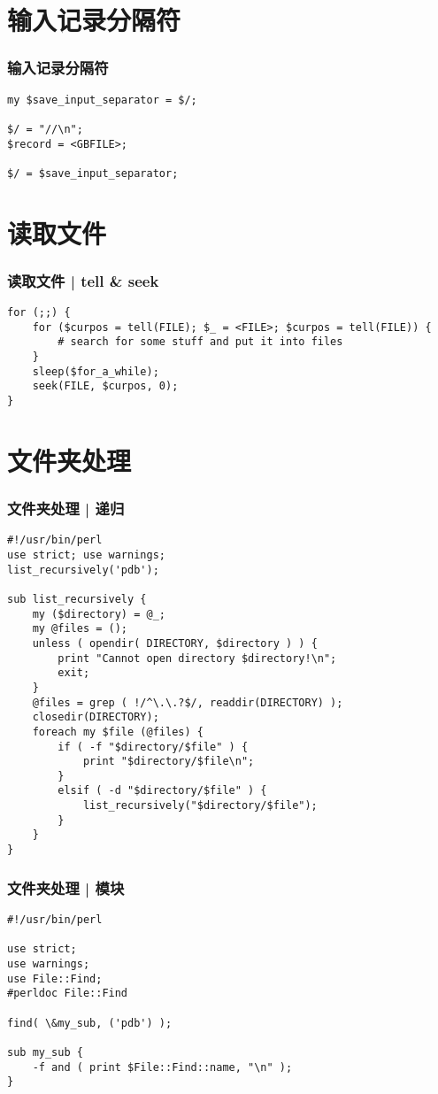 \section{输入记录分隔符}
\begin{frame}[fragile]
  \frametitle{输入记录分隔符}
\begin{lstlisting}
my $save_input_separator = $/;

$/ = "//\n";
$record = <GBFILE>;

$/ = $save_input_separator;
\end{lstlisting}  
\end{frame}

\section{读取文件}
\begin{frame}[fragile]
  \frametitle{读取文件 | tell \& seek}
\begin{lstlisting}
for (;;) {
    for ($curpos = tell(FILE); $_ = <FILE>; $curpos = tell(FILE)) {
        # search for some stuff and put it into files
    }
    sleep($for_a_while);
    seek(FILE, $curpos, 0);
}
\end{lstlisting}
\end{frame}

\section{文件夹处理}
\begin{frame}[fragile]
  \frametitle{文件夹处理 | 递归}
\begin{lstlisting}[basicstyle=\scriptsize\tt,numberstyle=\tiny]
#!/usr/bin/perl
use strict; use warnings;
list_recursively('pdb');

sub list_recursively {
    my ($directory) = @_;
    my @files = ();
    unless ( opendir( DIRECTORY, $directory ) ) {
        print "Cannot open directory $directory!\n";
        exit;
    }
    @files = grep ( !/^\.\.?$/, readdir(DIRECTORY) );
    closedir(DIRECTORY);
    foreach my $file (@files) {
        if ( -f "$directory/$file" ) {
            print "$directory/$file\n";
        }
        elsif ( -d "$directory/$file" ) {
            list_recursively("$directory/$file");
        }
    }
}
\end{lstlisting}
\end{frame}

\begin{frame}[fragile]
  \frametitle{文件夹处理 | 模块}
\begin{lstlisting}
#!/usr/bin/perl

use strict;
use warnings;
use File::Find;
#perldoc File::Find

find( \&my_sub, ('pdb') );

sub my_sub {
    -f and ( print $File::Find::name, "\n" );
}
\end{lstlisting}
\end{frame}

